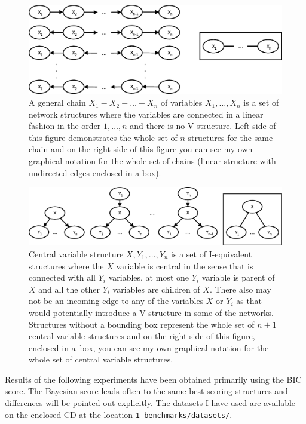 \documentclass[english,cover]{fitthesis} %
\newcommand{\srccode}[1]{{\tt #1}}         %
\begin{document}
\begin{figure}[ht]
    \centering
    \includegraphics[scale=0.39]{fig/structure-learning-chain}
    \caption{A general chain $X_1 - X_2 - \dots - X_n$ of variables $X_1, \dots, X_n$ is a set of network structures where the variables are connected in a linear fashion in the order $1, \dots, n$ and there is no V-structure. Left side of this figure demonstrates the whole set of $n$ structures for the same chain and on the right side of this figure you can see my own graphical notation for the whole set of chains (linear structure with undirected edges enclosed in a box).}
    \label{fig:structure_learning_chain}
\end{figure}
\begin{figure}[ht]
    \centering
    \includegraphics[scale=0.39]{fig/structure-learning-central-variable}
    \caption{Central variable structure $X,Y_1,\dots,Y_n$ is a set of I-equivalent structures where the $X$ variable is central in the sense that is connected with all $Y_i$ variables, at most one $Y_i$ variable is parent of $X$ and all the other $Y_i$ variables are children of $X$. There also may not be an incoming edge to any of the variables $X$ or $Y_i$ as that would potentially introduce a V-structure in some of the networks.
Structures without a bounding box represent the whole set of $n+1$ central variable structures and on the right side of this figure, enclosed in a~box, you can see my own graphical notation for the whole set of central variable structures.}
    \label{fig:structure_learning_central_variable}
\end{figure}

Results of the following experiments have been obtained primarily using the BIC score. The Bayesian score leads often to the same best-scoring structures and differences will be pointed out explicitly. The datasets I have used are available on the enclosed CD at the location \srccode{1-benchmarks/datasets/}.
\end{document}
